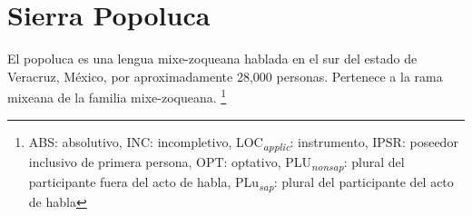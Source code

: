 \section*{Sierra Popoluca}

\noindent El popoluca es una lengua mixe-zoqueana hablada en el sur del estado de Veracruz, México, por aproximadamente 28,000 personas. Pertenece a la rama mixeana de la familia mixe-zoqueana.
\footnote{ABS: absolutivo, INC: incompletivo, LOC\textsubscript{\emph{applic}}: instrumento, IPSR: poseedor inclusivo de primera persona, OPT: optativo, PLU\textsubscript{\emph{nonsap}}: plural del participante fuera del acto de habla, PLu\textsubscript{\emph{sap}}: plural del participante del acto de habla}
\vspace{0.5cm}

